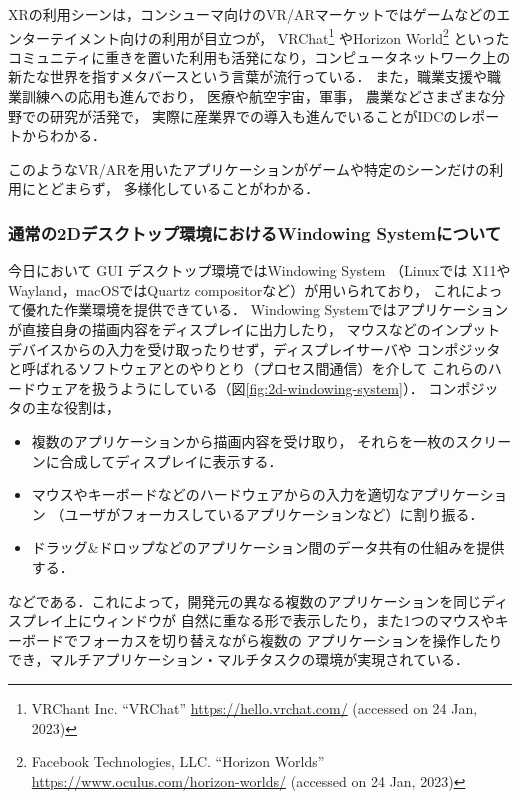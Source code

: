 XRの利用シーンは，コンシューマ向けのVR/ARマーケットではゲームなどのエンターテイメント向けの利用が目立つが，
VRChat\footnote{VRChant Inc. ``VRChat'' \url{https://hello.vrchat.com/} (accessed on 24 Jan, 2023)}
やHorizon World\footnote{Facebook Technologies, LLC. ``Horizon Worlds'' \url{https://www.oculus.com/horizon-worlds/} (accessed on 24 Jan, 2023)}
といったコミュニティに重きを置いた利用も活発になり，コンピュータネットワーク上の
新たな世界を指すメタバースという言葉が流行っている．
また，職業支援や職業訓練への応用も進んでおり，
医療\cite{Gallagher2005-gv}や航空宇宙\cite{aerospace}，軍事\cite{military}，
農業\cite{agriculture}などさまざまな分野での研究が活発で，
実際に産業界での導入も進んでいることがIDCのレポート\cite{idc-2022}からわかる．

このようなVR/ARを用いたアプリケーションがゲームや特定のシーンだけの利用にとどまらず，
多様化していることがわかる．

\subsubsection{通常の2Dデスクトップ環境におけるWindowing Systemについて}

今日において GUI デスクトップ環境ではWindowing System
（Linuxでは X11やWayland，macOSではQuartz compositorなど）が用いられており，
これによって優れた作業環境を提供できている．
Windowing Systemではアプリケーションが直接自身の描画内容をディスプレイに出力したり，
マウスなどのインプットデバイスからの入力を受け取ったりせず，ディスプレイサーバや
コンポジッタと呼ばれるソフトウェアとのやりとり（プロセス間通信）を介して
これらのハードウェアを扱うようにしている（図\ref{fig:2d-windowing-system}）．
コンポジッタの主な役割は，
\begin{itemize}
  \item 複数のアプリケーションから描画内容を受け取り，
        それらを一枚のスクリーンに合成してディスプレイに表示する．
  \item マウスやキーボードなどのハードウェアからの入力を適切なアプリケーション
        （ユーザがフォーカスしているアプリケーションなど）に割り振る．
  \item ドラッグ\&ドロップなどのアプリケーション間のデータ共有の仕組みを提供する．
\end{itemize}
などである．これによって，開発元の異なる複数のアプリケーションを同じディスプレイ上にウィンドウが
自然に重なる形で表示したり，また1つのマウスやキーボードでフォーカスを切り替えながら複数の
アプリケーションを操作したりでき，マルチアプリケーション・マルチタスクの環境が実現されている．


